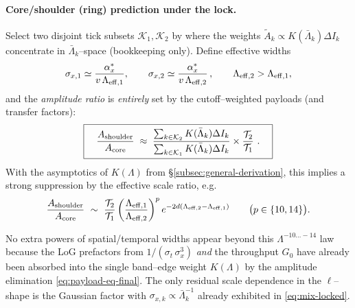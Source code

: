 \documentclass[10pt]{article}
\theoremstyle{definition}
\theoremstyle{plain}
\begin{document}
\paragraph{Core/shoulder (ring) prediction under the lock.}\label{par:uom-main-164}
Select two disjoint tick subsets $\mathcal K_1,\mathcal K_2$ by where the weights
$\widetilde A_k\propto K(\bar\Lambda_k)\Delta I_k$ concentrate in $\bar\Lambda_k$--space (bookkeeping only).
Define effective widths
\[
\sigma_{x,1}\simeq \frac{\alpha_x^{*}}{v\,\Lambda_{\rm eff,1}},\qquad
\sigma_{x,2}\simeq \frac{\alpha_x^{*}}{v\,\Lambda_{\rm eff,2}}\,,\qquad \Lambda_{\rm eff,2}>\Lambda_{\rm eff,1},
\]
and the \emph{amplitude ratio} is \emph{entirely} set by the cutoff–weighted payloads (and transfer factors):
\begin{equation}\label{eq:ring-core-bandlocked}
\boxed{\quad
\frac{A_{\rm shoulder}}{A_{\rm core}}
\;\approx\;
\frac{\sum_{k\in\mathcal K_2}K(\bar\Lambda_k)\Delta I_k}{\sum_{k\in\mathcal K_1}K(\bar\Lambda_k)\Delta I_k}
\times\frac{\mathcal T_2}{\mathcal T_1}\ .
\quad}
\end{equation}
With the asymptotics of \(K(\Lambda)\) from \S\ref{subsec:general-derivation}, this implies a strong suppression
by the effective scale ratio, e.g.
\[
\frac{A_{\rm shoulder}}{A_{\rm core}}
\ \sim\
\frac{\mathcal T_2}{\mathcal T_1}
\left(\frac{\Lambda_{\rm eff,1}}{\Lambda_{\rm eff,2}}\right)^{p}
e^{-2d(\Lambda_{\rm eff,2}-\Lambda_{\rm eff,1})}\qquad\big(p\in\{10,14\}\big).
\]


No extra powers of spatial/temporal widths appear beyond this \(\Lambda^{-10\dots-14}\) law because the LoG
prefactors from $1/(\sigma_t\,\sigma_x^3)$ \emph{and} the throughput $G_0$ have already been absorbed
into the single band--edge weight \(K(\Lambda)\) by the amplitude elimination
\eqref{eq:payload-eq-final}. The only residual scale dependence in the \(\ell\)--shape is the
Gaussian factor with \(\sigma_{x,k}\propto \bar\Lambda_k^{-1}\) already exhibited in \eqref{eq:mix-locked}.
\end{document}
